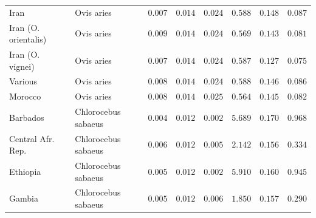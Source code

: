 \documentclass[12pt]{article}
\begin{document}
\begin{center}
\begin{longtable*}{|l|l|r|r|r|r|r|r|}
            Iran &          Ovis aries &               $ 0.007$ &              $ 0.014$ &              $ 0.024$ &                                          $ 0.588$ &                         $ 0.148$ &                      $ 0.087$ \\
            Iran (O. orientalis) &          Ovis aries &               $ 0.009$ &              $ 0.014$ &              $ 0.024$ &                                          $ 0.569$ &                         $ 0.143$ &                      $ 0.081$ \\
            Iran (O. vignei) &          Ovis aries &               $ 0.007$ &              $ 0.014$ &              $ 0.024$ &                                          $ 0.587$ &                         $ 0.127$ &                      $ 0.075$ \\
            Various &          Ovis aries &               $ 0.008$ &              $ 0.014$ &              $ 0.024$ &                                          $ 0.588$ &                         $ 0.146$ &                      $ 0.086$ \\
            Morocco &          Ovis aries &               $ 0.008$ &              $ 0.014$ &              $ 0.025$ &                                          $ 0.564$ &                         $ 0.145$ &                      $ 0.082$ \\
             Barbados & Chlorocebus sabaeus &               $ 0.004$ &              $ 0.012$ &              $ 0.002$ &                                          $ 5.689$ &                         $ 0.170$ &                      $ 0.968$ \\
             Central Afr. Rep. & Chlorocebus sabaeus &               $ 0.006$ &              $ 0.012$ &              $ 0.005$ &                                          $ 2.142$ &                         $ 0.156$ &                      $ 0.334$ \\
             Ethiopia & Chlorocebus sabaeus &               $ 0.005$ &              $ 0.012$ &              $ 0.002$ &                                          $ 5.910$ &                         $ 0.160$ &                      $ 0.945$ \\
             Gambia & Chlorocebus sabaeus &               $ 0.005$ &              $ 0.012$ &              $ 0.006$ &                                          $ 1.850$ &                         $ 0.157$ &                      $ 0.290$ \\

\end{longtable*}
\end{center}
\end{document}
